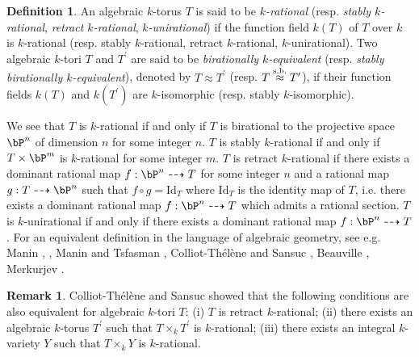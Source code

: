 \documentclass{amsart}
\theoremstyle{plain}
\theoremstyle{definition}
\newtheorem{definition}[theorem]{Definition}
\newtheorem{remark}[theorem]{Remark}
\theoremstyle{remark}
\newcommand{\Id}{\mathrm{Id}}
\begin{document}
\begin{definition}
An algebraic $k$-torus $T$ is said to be {\it $k$-rational} 
(resp. {\it stably $k$-rational}, {\it retract $k$-rational}, 
{\it $k$-unirational}) 
if the function field $k(T)$ of $T$ over $k$ is $k$-rational 
(resp. stably $k$-rational, retract $k$-rational, $k$-unirational). 
Two algebraic $k$-tori $T$ and $T^\prime$ 
are said to be 
{\it birationally $k$-equivalent} %
(resp. {\it stably birationally $k$-equivalent}), 
denoted by $T\approx T^\prime$ 
(resp. $T\stackrel{\rm s.b.}{\approx} T^\prime$), 
if their function fields $k(T)$ and $k(T^\prime)$ are 
$k$-isomorphic (resp. stably $k$-isomorphic). 
\end{definition}

We see that 
$T$ is $k$-rational if and only if $T$ is birational 
to the projective space $\bP^n$ of dimension $n$ for some integer $n$. 
$T$ is stably $k$-rational if and only if $T\times \bP^m$ is $k$-rational 
for some integer $m$.  
$T$ is retract $k$-rational if there exists a dominant rational map 
$f: \bP^n\dashrightarrow T$ for some integer $n$ and 
a rational map $g: T\dashrightarrow \bP^n$ such that 
$f\circ g=\Id_T$ where $\Id_T$ is the identity map of $T$, 
i.e. there exists a dominant rational map $f: \bP^n\dashrightarrow T$ which 
admits a rational section. 
$T$ is $k$-unirational if and only if there exists a dominant rational map 
$f: \bP^n\dashrightarrow T$. 
%
For an equivalent definition in the language of algebraic geometry, 
see e.g. 
Manin \cite{Man74}, \cite{Man86}, 
Manin and Tsfasman \cite{MT86}, 
Colliot-Th\'{e}l\`{e}ne and Sansuc \cite[Section 1]{CTS07}, 
Beauville \cite{Bea16}, 
Merkurjev \cite[Section 3]{Mer17}. 

\begin{remark}\label{rem1.13}
Colliot-Th\'el\`ene and Sansuc {\cite[Proposition 7.4, page 181]{CTS87}} 
showed that the following conditions are also equivalent 
for algebraic $k$-tori $T$: 
(i) $T$ is retract $k$-rational; 
(ii) there exists an algebraic $k$-torus $T^\prime$ 
such that $T\times_k T^\prime$ is $k$-rational; 
(iii) there exists an integral $k$-variety $Y$ such that 
$T\times_k Y$ is $k$-rational. 
\end{remark}
\end{document}
